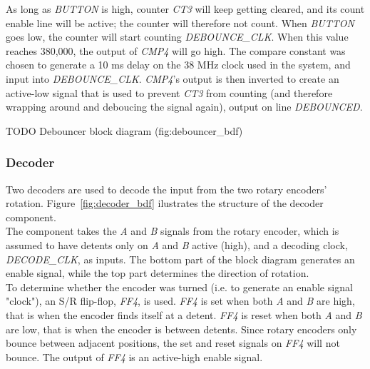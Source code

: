 \documentclass{scrartcl}
\begin{document}
	As long as \textit{BUTTON} is high, counter \textit{CT3} will keep getting cleared, and its count enable line will be active; the counter will therefore not count. When \textit{BUTTON} goes low, the counter will start counting \textit{DEBOUNCE_CLK}. When this value reaches 380,000, the output of \textit{CMP4} will go high. The compare constant was chosen to generate a 10 ms delay on the 38 MHz clock used in the system, and input into \textit{DEBOUNCE_CLK}. \textit{CMP4}'s output is then inverted to create an active-low signal that is used to prevent \textit{CT3} from counting (and therefore wrapping around and deboucing the signal again), output on line \textit{DEBOUNCED}.

	TODO Debouncer block diagram (fig:debouncer_bdf)
	
	\subsubsection{Decoder \label{sec:decoder}}
	Two decoders are used to decode the input from the two rotary encoders' rotation. Figure~\ref{fig:decoder_bdf} ilustrates the structure of the decoder component.\\

	The component takes the \textit{A} and \textit{B} signals from the rotary encoder, which is assumed to have detents only on \textit{A} and \textit{B} active (high), and a decoding clock, \textit{DECODE_CLK}, as inputs. The bottom part of the block diagram generates an enable signal, while the top part determines the direction of rotation.\\

	To determine whether the encoder was turned (i.e. to generate an enable signal "clock"), an S/R flip-flop, \textit{FF4}, is used. \textit{FF4} is set when both \textit{A} and \textit{B} are high, that is when the encoder finds itself at a detent. \textit{FF4} is reset when both \textit{A} and \textit{B} are low, that is when the encoder is between detents. Since rotary encoders only bounce between adjacent positions, the set and reset signals on \textit{FF4} will not bounce. The output of \textit{FF4} is an active-high enable signal.\\
\end{document}
